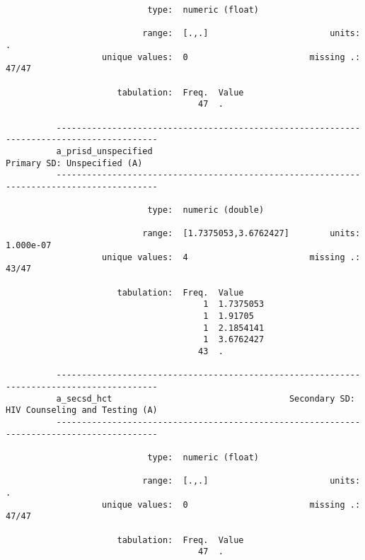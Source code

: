 \documentclass{article}
\begin{document}
\begin{verbatim}
                            type:  numeric (float)
          
                           range:  [.,.]                        units:  .
                   unique values:  0                        missing .:  47/47
          
                      tabulation:  Freq.  Value
                                      47  .
          
          ------------------------------------------------------------------------------------------
          a_prisd_unspecified                                            Primary SD: Unspecified (A)
          ------------------------------------------------------------------------------------------
          
                            type:  numeric (double)
          
                           range:  [1.7375053,3.6762427]        units:  1.000e-07
                   unique values:  4                        missing .:  43/47
          
                      tabulation:  Freq.  Value
                                       1  1.7375053
                                       1  1.91705
                                       1  2.1854141
                                       1  3.6762427
                                      43  .
          
          ------------------------------------------------------------------------------------------
          a_secsd_hct                                   Secondary SD: HIV Counseling and Testing (A)
          ------------------------------------------------------------------------------------------
          
                            type:  numeric (float)
          
                           range:  [.,.]                        units:  .
                   unique values:  0                        missing .:  47/47
          
                      tabulation:  Freq.  Value
                                      47  .
          
          
          
          
          
          
\end{verbatim}
\end{document}
